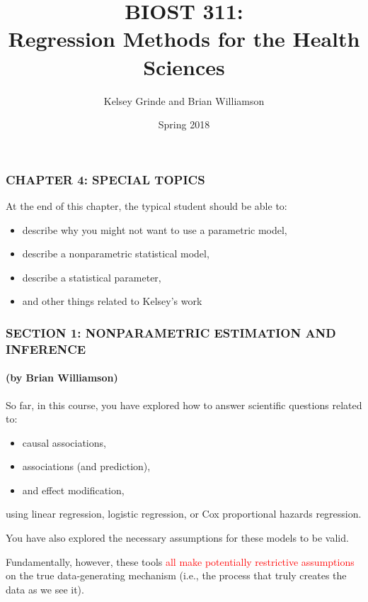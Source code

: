 \documentclass[12pt, 
hyperref={colorlinks=true, linkcolor=blue, urlcolor=cyan}]{beamer}
\title{BIOST 311: \\ Regression Methods for the Health Sciences}
\author{Kelsey Grinde and Brian Williamson}
\institute{UW Biostatistics}
\date{Spring 2018}
\begin{document}
\begin{frame}
\titlepage\thispagestyle{empty}
\end{frame}

  
\setcounter{framenumber}{\value{chap1}}

\begin{frame}
\frametitle{CHAPTER 4: SPECIAL TOPICS}
At the end of this chapter, the typical student should be able to:
\begin{itemize}
\item describe why you might not want to use a parametric model,
\item describe a nonparametric statistical model,
\item describe a statistical parameter, 
\item and other things related to Kelsey's work
\end{itemize}
\end{frame}

\begin{frame}
\frametitle{SECTION 1: {\small NONPARAMETRIC ESTIMATION AND INFERENCE}}
\framesubtitle{(by Brian Williamson)}

So far, in this course, you have explored how to answer scientific questions related to: \vspace{-0.3cm}
\begin{itemize}
\item causal associations,
\item associations (and prediction),
\item and effect modification,
\end{itemize} \vspace{-0.3cm}
using linear regression, logistic regression, or Cox proportional hazards regression.

You have also explored the necessary assumptions for these models to be valid.

Fundamentally, however, these tools \textcolor{red}{all make potentially restrictive assumptions} on the true data-generating mechanism (i.e., the process that truly creates the data as we see it).
\end{frame}
\end{document}

